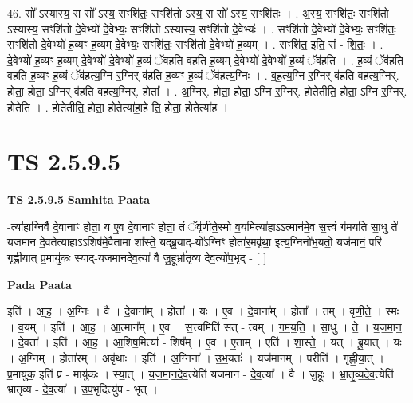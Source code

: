 \documentclass[17pt]{extarticle}
\begin{document}
46. सो᳚ ऽस्यास्य॒ स सो᳚ ऽस्य॒ सꣳशि॑तः॒ सꣳशि॑तो ऽस्य॒ स सो᳚ ऽस्य॒ सꣳशि॑तः । . अ॒स्य॒ सꣳशि॑तः॒ सꣳशि॑तो ऽस्यास्य॒ सꣳशि॑तो दे॒वेभ्यो॑ दे॒वेभ्यः॒ सꣳशि॑तो ऽस्यास्य॒ सꣳशि॑तो दे॒वेभ्यः॑ । . सꣳशि॑तो दे॒वेभ्यो॑ दे॒वेभ्यः॒ सꣳशि॑तः॒ सꣳशि॑तो दे॒वेभ्यो॑ ह॒व्यꣳ ह॒व्यम् दे॒वेभ्यः॒ सꣳशि॑तः॒ सꣳशि॑तो दे॒वेभ्यो॑ ह॒व्यम् । . सꣳशि॑त॒ इति॒ सं - शि॒तः॒ । . दे॒वेभ्यो॑ ह॒व्यꣳ ह॒व्यम् दे॒वेभ्यो॑ दे॒वेभ्यो॑ ह॒व्यं ॅव॑हति वहति ह॒व्यम् दे॒वेभ्यो॑ दे॒वेभ्यो॑ ह॒व्यं ॅव॑हति । . ह॒व्यं ॅव॑हति वहति ह॒व्यꣳ ह॒व्यं ॅव॑हत्य॒ग्नि र॒ग्निर् व॑हति ह॒व्यꣳ ह॒व्यं ॅव॑हत्य॒ग्निः । . व॒ह॒त्य॒ग्नि र॒ग्निर् व॑हति वहत्य॒ग्निर्. होता॒ होता॒ ऽग्निर् व॑हति वहत्य॒ग्निर्. होता᳚ । . अ॒ग्निर्. होता॒ होता॒ ऽग्नि र॒ग्निर्. होतेतीति॒ होता॒ ऽग्नि र॒ग्निर्. होतेति॑ । . होतेतीति॒ होता॒ होतेत्या॑हा॒हे ति॒ होता॒ होतेत्या॑ह । \newline
\pagebreak
{}
\section*{ TS 2.5.9.5 }

\textbf{TS 2.5.9.5 } \newline
\textbf{Samhita Paata} \newline

-त्या॑हा॒ग्निर्वै दे॒वानाꣳ॒॒ होता॒ य ए॒व दे॒वानाꣳ॒॒ होता॒ तं ॅवृ॑णीते॒स्मो व॒यमित्या॑हा॒ऽऽत्मान॑मे॒व स॒त्त्वं ग॑मयति सा॒धु ते॑ यजमान दे॒वतेत्या॑हा॒ऽऽशिष॑मे॒वैतामा शा᳚स्ते॒ यद्ब्रू॒याद्-यो᳚ऽग्निꣳ होता॑र॒मवृ॑था॒ इत्य॒ग्निनो॑भ॒यतो॒ यज॑मानं॒ परि॑ गृह्णीयात् प्र॒मायु॑कः स्याद्-यजमानदेव॒त्या॑ वै जु॒हूर्भ्रा॑तृव्य देव॒त्यो॑प॒भृद् - [  ] \newline

\textbf{Pada Paata} \newline

इति॑ । आ॒ह॒ । अ॒ग्निः । वै । दे॒वाना᳚म् । होता᳚ । यः । ए॒व । दे॒वाना᳚म् । होता᳚ । तम् । वृ॒णी॒ते॒ । स्मः । व॒यम् । इति॑ । आ॒ह॒ । आ॒त्मान᳚म् । ए॒व । स॒त्त्वमिति॑ सत् - त्वम् । ग॒म॒य॒ति॒ । सा॒धु । ते॒ । य॒ज॒मा॒न॒ । दे॒वता᳚ । इति॑ । आ॒ह॒ । आ॒शिष॒मित्या᳚ - शिष᳚म् । ए॒व । ए॒ताम् । एति॑ । शा॒स्ते॒ । यत् । ब्रू॒यात् । यः । अ॒ग्निम् । होता॑रम् । अवृ॑थाः । इति॑ । अ॒ग्निना᳚ । उ॒भ॒यतः॑ । यज॑मानम् । परीति॑ । गृ॒ह्णी॒या॒त् । प्र॒मायु॑क॒ इति॑ प्र - मायु॑कः । स्या॒त् । य॒ज॒मा॒न॒दे॒व॒त्येति॑ यजमान - दे॒व॒त्या᳚ । वै । जु॒हूः । भ्रा॒तृ॒व्य॒दे॒व॒त्येति॑ भ्रातृव्य - दे॒व॒त्या᳚ । उ॒प॒भृदित्यु॑प - भृत् ।  \newline
\end{document}
